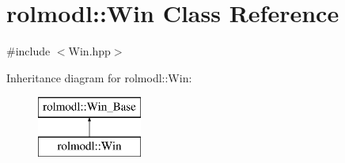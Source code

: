 \hypertarget{classrolmodl_1_1_win}{}\section{rolmodl\+::Win Class Reference}
\label{classrolmodl_1_1_win}


{\ttfamily \#include $<$Win.\+hpp$>$}

Inheritance diagram for rolmodl\+::Win\+:\begin{figure}[H]
\begin{center}
\leavevmode
\includegraphics[height=2.000000cm]{classrolmodl_1_1_win}
\end{center}
\end{figure}
